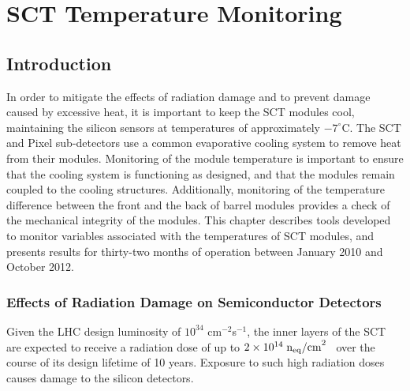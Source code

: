 \graphicspath{{Chapters/SCT/Figures/}}

\chapter{SCT Temperature Monitoring}
\label{chap:SCT}

\section{Introduction}

In order to mitigate the effects of radiation damage and to prevent damage
caused by excessive heat, it is important to keep the SCT modules cool,
maintaining the silicon sensors at temperatures of approximately $-7^{\circ}$C.
The SCT and Pixel sub-detectors use a common evaporative cooling system to
remove heat from their modules. Monitoring of the module temperature is
important to ensure that the cooling system is functioning as designed, and that
the modules remain coupled to the cooling structures.  Additionally, monitoring
of the temperature difference between the front and the back of barrel modules
provides a check of the mechanical integrity of the modules. This chapter
describes tools developed to monitor variables associated with the temperatures
of SCT modules, and presents results for thirty-two months of operation between
January 2010 and October 2012.



\subsection{Effects of Radiation Damage on Semiconductor Detectors}

Given the LHC design luminosity of $10^{34}$ cm$^{-2}$s$^{-1}$, the inner layers
of the SCT are expected to receive a radiation dose of up to
$2\times10^{14}\;\rm{n_{eq}/cm}^2$~\cite{Ahmad200798} over the course of its
design lifetime of 10 years.  Exposure to such high radiation doses causes
damage to the silicon detectors. 

